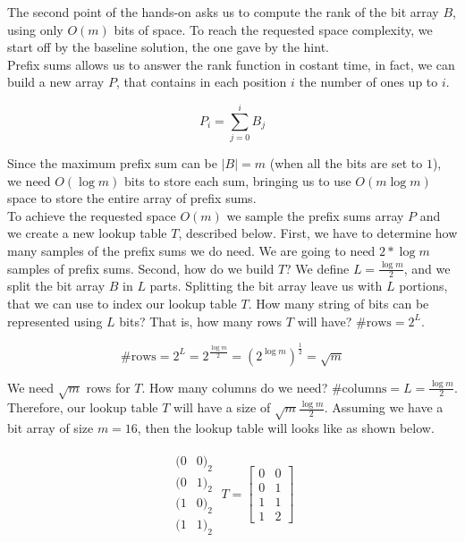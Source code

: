 \documentclass{article}
\begin{document}
The second point of the hands-on asks us to compute the rank of the bit array $B$, using only $O(m)$ bits of space. To reach the requested space complexity,
we start off by the baseline solution, the one gave by the hint.\\

\noindent Prefix sums allows us to answer the rank function in costant time, in fact, we can build a new array $P$, that contains in each position $i$ the number of ones
up to $i$.

\begin{equation}
    P_i = \sum_{j = 0}^{i} B_j
\end{equation}

\noindent Since the maximum prefix sum can be $|B| = m$ (when all the bits are set to $1$), we need $O(\log m)$ bits to store each sum, bringing us to use
$O(m \log m)$ space to store the entire array of prefix sums.\\

\noindent To achieve the requested space $O(m)$ we sample the prefix sums array $P$ and we create a new lookup table $T$, described below. First, we have to determine how many samples
of the prefix sums we do need. We are going to need $2 * \log m$ samples of prefix sums. Second, how do we build $T$? We define $L = \frac{\log m}{2}$, and we split the bit array $B$
in $L$ parts. Splitting the bit array leave us with $L$ portions, that we can use to index our lookup table $T$. 
How many string of bits can be represented using $L$ bits? That is, how many rows $T$ will have? $\#\textrm{rows} = 2^L$.

\begin{equation}
    \textrm{\#rows} = 2^L = 2^{\frac{\log m}{2}} = (2^{\log m})^{\frac{1}{2}} = \sqrt m
\end{equation}

\noindent We need $\sqrt m$ rows for $T$. How many columns do we need? $\# \textrm{columns} = L = \frac{\log m}{2}$. Therefore, our lookup table $T$ will have a size of $\sqrt m \frac{\log m}{2}$. Assuming we have a bit array of size 
$m = 16$, then the lookup table will looks like as shown below.

\begin{align}
     \begin{matrix}
         (0 & 0)_2 \\
         (0 & 1)_2 \\
         (1 & 0)_2 \\
         (1 & 1)_2 
     \end{matrix} \;
     T = 
     \begin{bmatrix}
        0 & 0 \\
        0 & 1 \\
        1 & 1 \\
        1 & 2
    \end{bmatrix} 
\end{align}
\end{document}
